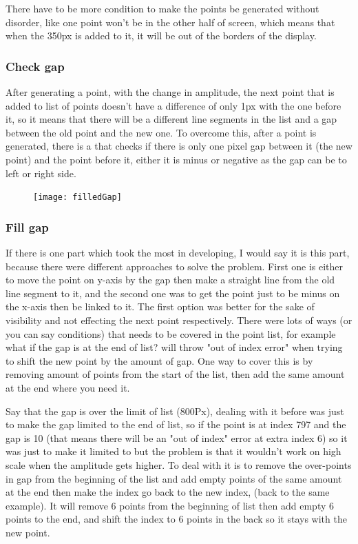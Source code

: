 There have to be more condition to make the points be generated without disorder, like one point won't be in the other half of screen, which means that when the 350px is added to it, it will be out of the borders of the display.


\subsubsection{Check gap}
After generating a point, with the change in amplitude, the next point that is added to list of points doesn't have a difference of only 1px with the one before it, so it means that there will be a different line segments in the list and a gap between the old point and the new one. To overcome this, after a point is generated, there is a  that checks if there is only one pixel gap between it (the new point) and the point before it, either it is minus or negative as the gap can be to left or right side.

\begin{figure}[H]
	\texttt{[image: filledGap]}
\end{figure}

\subsubsection{Fill gap}
If there is one part which took the most in developing, I would say it is this part, because there were different approaches to solve the problem. First one is either to move the point on y-axis by the gap then make a straight line from the old line segment to it, and the second one was to get the point just to be minus on the x-axis then be linked to it. The first option was better for the sake of visibility and not effecting the next point respectively. There were lots of ways (or you can say conditions) that needs to be covered in the point list, for example what if the gap is at the end of list?  will throw "out of index error" when trying to shift the new point by the amount of gap. One way to cover this is by removing amount of points from the start of the list, then add the same amount at the end where you need it.

Say that the gap is over the limit of list (800Px), dealing with it before was just to make the gap limited to the end of list, so if the point is at index 797 and the gap is 10 (that means there will be an "out of index" error at extra index 6) so it was just to make it limited to   but the problem is that it wouldn't work on high scale when the amplitude gets higher.
To deal with it is to remove the over-points in gap from the beginning of the list and add empty points of the same amount at the end then make the index go back to the new index, (back to the same example). It will remove 6 points from the beginning of list then add empty 6 points to the end, and shift the index to 6 points in the back so it stays with the new point.

